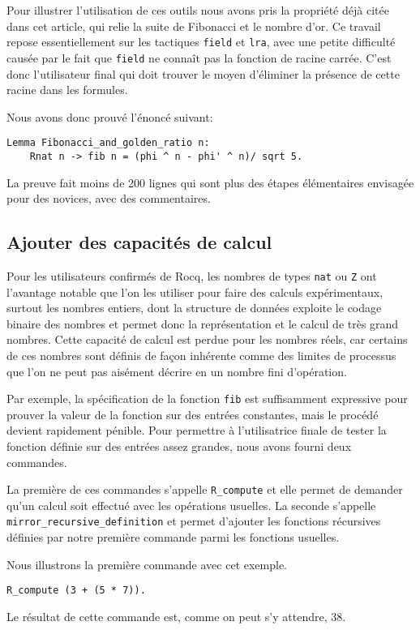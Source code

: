 \documentclass[draft]{jflart}
\begin{document}
Pour illustrer l'utilisation de ces outils nous avons pris la
propriété déjà citée dans cet article, qui relie la suite de Fibonacci
et le nombre d'or.  Ce travail repose essentiellement sur les
tactiques \texttt{field} et \texttt{lra}, avec une petite difficulté causée
par le fait que \texttt{field} ne connaît pas la fonction de racine
carrée.  C'est donc l'utilisateur final qui doit trouver le moyen
d'éliminer la présence de cette racine dans les formules.

Nous avons donc prouvé l'énoncé suivant:
\begin{verbatim}
Lemma Fibonacci_and_golden_ratio n:
    Rnat n -> fib n = (phi ^ n - phi' ^ n)/ sqrt 5.
\end{verbatim}
La preuve fait moins de 200 lignes qui sont plus des étapes
élémentaires envisagée pour des novices, avec des commentaires.
\subsection{Ajouter des capacités de calcul}
Pour les utilisateurs confirmés de Rocq, les nombres de types \texttt{nat} ou
\texttt{Z} ont l'avantage notable que l'on les utiliser pour faire des calculs
expérimentaux, surtout les nombres entiers, dont la structure de données
exploite le codage binaire des nombres et permet donc la représentation
et le calcul de très grand nombres.  Cette capacité de calcul est perdue pour
les nombres réels, car certains de ces nombres sont définis de façon inhérente
comme des limites de processus que l'on ne peut pas aisément décrire en
un nombre fini d'opération.

Par exemple, la spécification de la fonction \texttt{fib} est
suffisamment expressive pour prouver la valeur de la fonction sur des
entrées constantes, mais le procédé devient rapidement pénible.  Pour
permettre à l'utilisatrice finale de tester la fonction définie sur des
entrées assez grandes, nous avons fourni deux commandes.

La première de ces commandes s'appelle \texttt{R\_compute} et elle
permet de demander qu'un calcul soit effectué avec les opérations
usuelles.  La seconde s'appelle \texttt{mirror\_recursive\_definition}
et permet d'ajouter les fonctions récursives définies par notre
première commande parmi les fonctions usuelles.

Nous illustrons la première commande avec cet exemple.
\begin{verbatim}
R_compute (3 + (5 * 7)).
\end{verbatim}
Le résultat de cette commande est, comme on peut s'y attendre, 38.
\end{document}
